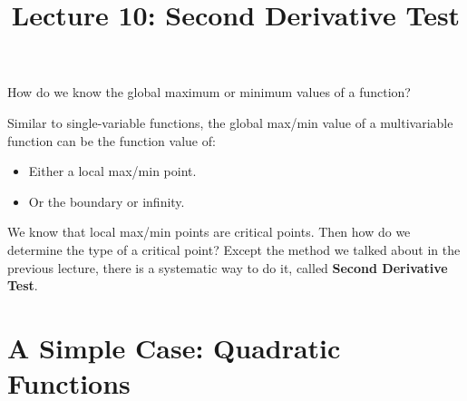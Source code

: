 \documentclass{article}
\title{Lecture 10: Second Derivative Test}
\author{}
\date{}
\begin{document}
    
\maketitle

How do we know the global maximum or minimum values of a function?

Similar to single-variable functions, the global max/min value of a 
multivariable function can be the function value of:
\begin{itemize}
  \item Either a local max/min point.
  \item Or the boundary or infinity.
\end{itemize}

We know that local max/min points are critical points. Then how do we determine 
the type of a critical point? Except the method we talked about in the previous 
lecture, there is a systematic way to do it, called 
\textbf{Second Derivative Test}.

\section{A Simple Case: Quadratic Functions}
\end{document}
